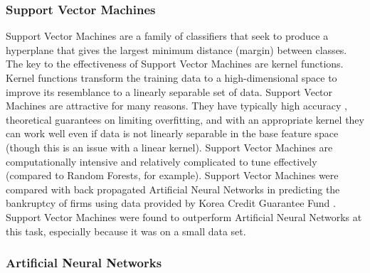 \documentclass[../thesis/thesis.tex]{subfiles}
\begin{document}
\subsubsection{Support Vector Machines}

Support Vector Machines are a family of classifiers that seek to produce a hyperplane that gives the largest minimum distance (margin) between classes. The key to the effectiveness of Support Vector Machines are kernel functions. Kernel functions transform the training data to a high-dimensional space to improve its resemblance to a linearly separable set of data. Support Vector Machines are attractive for many reasons. They have typically high accuracy \cite{caruana2006}, theoretical guarantees on limiting overfitting, and with an appropriate kernel they can work well even if data is not linearly separable in the base feature space (though this is an issue with a linear kernel). Support Vector Machines are computationally intensive and relatively complicated to tune effectively (compared to Random Forests, for example). Support Vector Machines were compared with back propagated Artificial Neural Networks in predicting the bankruptcy of firms using data provided by Korea Credit Guarantee Fund \cite{shin2005}. Support Vector Machines were found to outperform Artificial Neural Networks at this task, especially because it was on a small data set.

\subsubsection{Artificial Neural Networks}
\end{document}
